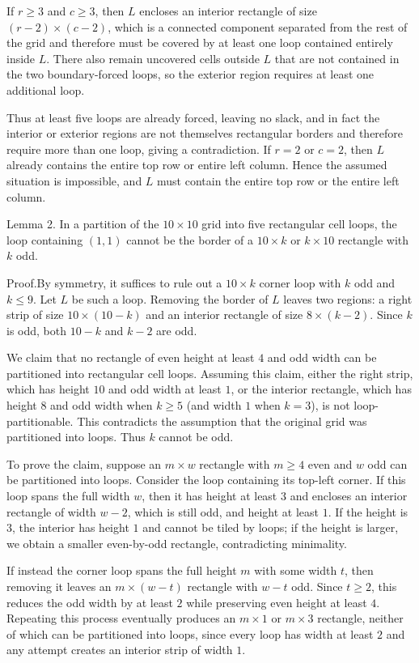 \begin{enumerate}
 If $r\ge3$ and $c\ge3$, then $L$ encloses an interior rectangle of size $(r-2)\times(c-2)$, which is a connected component separated from the rest of the grid and therefore must be covered by at least one loop contained entirely inside $L$. There also remain uncovered cells outside $L$ that are not contained in the two boundary-forced loops, so the exterior region requires at least one additional loop.

 Thus at least five loops are already forced, leaving no slack, and in fact the interior or exterior regions are not themselves rectangular borders and therefore require more than one loop, giving a contradiction. If $r=2$ or $c=2$, then $L$ already contains the entire top row or entire left column. Hence the assumed situation is impossible, and $L$ must contain the entire top row or the entire left column.

 Lemma 2. In a partition of the $10\times10$ grid into five rectangular cell loops, the loop containing $(1,1)$ cannot be the border of a $10\times k$ or $k\times10$ rectangle with $k$ odd.

 Proof.By symmetry, it suffices to rule out a $10\times k$ corner loop with $k$ odd and $k\le9$. Let $L$ be such a loop. Removing the border of $L$ leaves two regions: a right strip of size $10\times(10-k)$ and an interior rectangle of size $8\times(k-2)$. Since $k$ is odd, both $10-k$ and $k-2$ are odd.

 We claim that no rectangle of even height at least $4$ and odd width can be partitioned into rectangular cell loops. Assuming this claim, either the right strip, which has height $10$ and odd width at least $1$, or the interior rectangle, which has height $8$ and odd width when $k\ge5$ (and width $1$ when $k=3$), is not loop-partitionable. This contradicts the assumption that the original grid was partitioned into loops. Thus $k$ cannot be odd.

 To prove the claim, suppose an $m\times w$ rectangle with $m\ge4$ even and $w$ odd can be partitioned into loops. Consider the loop containing its top-left corner. If this loop spans the full width $w$, then it has height at least $3$ and encloses an interior rectangle of width $w-2$, which is still odd, and height at least $1$. If the height is $3$, the interior has height $1$ and cannot be tiled by loops; if the height is larger, we obtain a smaller even-by-odd rectangle, contradicting minimality.

 If instead the corner loop spans the full height $m$ with some width $t$, then removing it leaves an $m\times(w-t)$ rectangle with $w-t$ odd. Since $t\ge2$, this reduces the odd width by at least $2$ while preserving even height at least $4$. Repeating this process eventually produces an $m\times1$ or $m\times3$ rectangle, neither of which can be partitioned into loops, since every loop has width at least $2$ and any attempt creates an interior strip of width $1$.


\end{enumerate}
